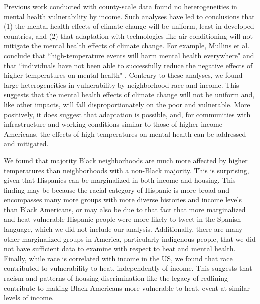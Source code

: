 \documentclass[fleqn,10pt]{wlscirep}
\begin{document}
Previous work conducted with county-scale data found no heterogeneities in mental health vulnerability by income.  Such analyses have led to conclusions that (1) the mental health effects of climate change will be uniform, least in developed countries, and (2) that adaptation with technologies like air-conditioning will not mitigate the mental health effects of climate change.  For example, Mullins et al. conclude that ``high-temperature events will harm mental health everywhere" and that ``individuals have not been able to successfully reduce the negative effects of higher temperatures on mental health" \cite{Mullins2019Dec}. Contrary to these analyses, we found large heterogeneities in vulnerability by neighborhood race and income.  This suggests that the mental health effects of climate change will not be uniform and, like other impacts, will fall disproportionately on the poor and vulnerable.  More positively, it does suggest that adaptation is possible, and, for communities with infrastructure and working conditions similar to those of higher-income Americans, the effects of high temperatures on mental health can be addressed and mitigated.

We found that majority Black neighborhoods are much more affected by higher temperatures than neighborhoods with a non-Black majority. This is surprising, given that Hispanics can be marginalized in both income and housing. This finding may be because the racial category of Hispanic is more broad and encompasses many more groups with more diverse histories and income levels than Black Americans, or may also be due to that fact that more marginalized and heat-vulnerable Hispanic people were more likely to tweet in the Spanish language, which we did not include our analysis.  Additionally, there are many other marginalized groups in America, particularly indigenous people, that we did not have sufficient data to examine with respect to heat and mental health.  Finally, while race is correlated with income in the US, we found that race contributed to vulnerability to heat, independently of income. This suggests that racism and patterns of housing discrimination like the legacy of redlining contribute to making Black Americans more vulnerable to heat, event at similar levels of income.
\end{document}
